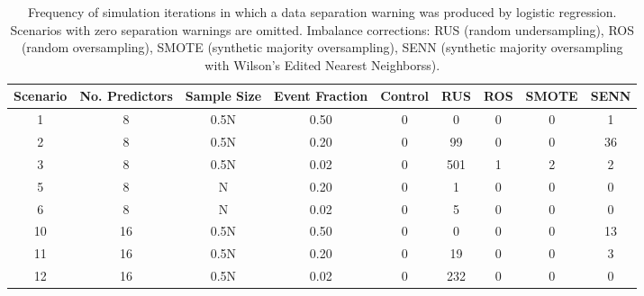 \documentclass[
]{article}
\begin{document}
\begin{table}[!h]
\renewcommand\thetable{S3} 
\caption{\label{tab:S3} Frequency of simulation iterations in which a data separation warning was produced by logistic regression. Scenarios with zero separation warnings are omitted. Imbalance corrections: RUS (random undersampling), ROS (random oversampling), SMOTE (synthetic majority oversampling), SENN (synthetic majority oversampling with Wilson's Edited Nearest Neighborss).}
\centering
\begin{tabular}[t]{ccccccccc}
\toprule
Scenario & No. Predictors & Sample Size & Event Fraction & Control & RUS & ROS & SMOTE & SENN\\
\midrule
1 & 8 & 0.5N & 0.50 & 0 & 0 & 0 & 0 & 1\\
 
2 & 8 & 0.5N & 0.20 & 0 & 99 & 0 & 0 & 36\\
 
3 & 8 & 0.5N & 0.02 & 0 & 501 & 1 & 2 & 2\\
 
5 & 8 & N & 0.20 & 0 & 1 & 0 & 0 & 0\\
 
6 & 8 & N & 0.02 & 0 & 5 & 0 & 0 & 0\\
 
10 & 16 & 0.5N & 0.50 & 0 & 0 & 0 & 0 & 13\\
 
11 & 16 & 0.5N & 0.20 & 0 & 19 & 0 & 0 & 3\\
 
12 & 16 & 0.5N & 0.02 & 0 & 232 & 0 & 0 & 0\\
\bottomrule
\end{tabular}
\end{table}

\hfill\break
\end{document}
